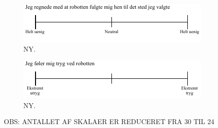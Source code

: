 \noindent
%
%
\begin{figure}[H]
\centering
\includegraphics[width =\textwidth]{Figure/UdvalgteSkalaer/RobottenFulgteMigDetRigtigeStedHen} 
\caption{NY.}
\label{fig:SkalaRFulgteMigDetRigtigeStedHen}
\end{figure}
\noindent
%
%
\begin{figure}[H]
\centering
\includegraphics[width =\textwidth]{Figure/UdvalgteSkalaer/TrygVedR} 
\caption{NY.}
\label{fig:SkalaTrygVedR}
\end{figure}
\noindent
%


OBS: ANTALLET AF SKALAER ER REDUCERET FRA 30 TIL 24
